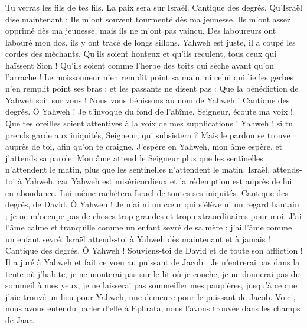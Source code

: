 \begin{multicols}{2}
Tu verras les fils de tes fils. La paix sera sur Israël.
\VerseOne{}Cantique des degrés. Qu'Israël dise maintenant : Ils m'ont souvent tourmenté dès ma jeunesse.
Ils m'ont assez opprimé dès ma jeunesse, mais ils ne m'ont pas vaincu.
Des laboureurs ont labouré mon dos, ils y ont tracé de longs sillons.
Yahweh est juste, il a coupé les cordes des méchants.
Qu'ils soient honteux et qu'ils reculent, tous ceux qui haïssent Sion !
Qu'ils soient comme l'herbe des toits qui sèche avant qu'on l'arrache !
Le moissonneur n'en remplit point sa main, ni celui qui lie les gerbes n'en remplit point ses bras ;
et les passants ne disent pas : Que la bénédiction de Yahweh soit sur vous ! Nous vous bénissons au nom de Yahweh !
\VerseOne{}Cantique des degrés. Ô Yahweh ! Je t'invoque du fond de l'abîme.
Seigneur, écoute ma voix ! Que tes oreilles soient attentives à la voix de mes supplications !
Yahweh ! si tu prends garde aux iniquités, Seigneur, qui subsistera ?
Mais le pardon se trouve auprès de toi, afin qu'on te craigne.
J'espère en Yahweh, mon âme espère, et j'attends sa parole.
Mon âme attend le Seigneur plus que les sentinelles n'attendent le matin, plus que les sentinelles n'attendent le matin.
Israël, attends-toi à Yahweh, car Yahweh est miséricordieux et la rédemption est auprès de lui en abondance.
Lui-même rachètera Israël de toutes ses iniquités.
\VerseOne{}Cantique des degrés, de David. Ô Yahweh ! Je n'ai ni un cœur qui s'élève ni un regard hautain ; je ne m'occupe pas de choses trop grandes et trop extraordinaires pour moi.
J'ai l'âme calme et tranquille comme un enfant sevré de sa mère ; j'ai l'âme comme un enfant sevré.
Israël attends-toi à Yahweh dès maintenant et à jamais !
\VerseOne{}Cantique des degrés. Ô Yahweh ! Souviens-toi de David et de toute son affliction !
Il a juré à Yahweh et fait ce vœu au puissant de Jacob :
Je n'entrerai pas dans la tente où j'habite, je ne monterai pas sur le lit où je couche,
je ne donnerai pas du sommeil à mes yeux, je ne laisserai pas sommeiller mes paupières,
jusqu'à ce que j'aie trouvé un lieu pour Yahweh, une demeure pour le puissant de Jacob.
Voici, nous avons entendu parler d'elle à Ephrata, nous l'avons trouvée dans les champs de Jaar.

\end{multicols}
